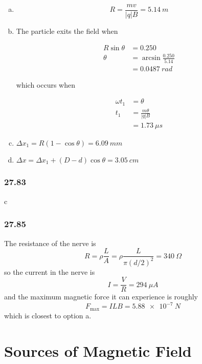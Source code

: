 \documentclass{article}
\begin{document}
\begin{enumerate}[(a)]
  \item \[R = \frac{m v}{|q| B} = \qty{5.14}{m}\]

  \item The particle exits the field when

        \begin{align*}
          R \sin \theta & = 0.250                      \\
          \theta        & = \arcsin \frac{0.250}{5.14} \\
                        & = \qty{0.0487}{rad}
        \end{align*}

        which occurs when

        \begin{align*}
          \omega t_1 & = \theta                 \\
          t_1        & = \frac{m \theta}{|q| B} \\
                     & = \qty{1.73}{\mu s}
        \end{align*}

  \item $\Delta x_1 = R (1 - \cos \theta) = \qty{6.09}{mm}$

  \item $\Delta x = \Delta x_1 + (D - d) \cos \theta = \qty{3.05}{cm}$
\end{enumerate}

\subsubsection{27.83}

c

\subsubsection{27.85}

The resistance of the nerve is \[R = \rho \frac{L}{A} = \rho \frac{L}{\pi (d / 2)^2} = \qty{340}{\Omega}\] so the current in the nerve is \[I = \frac{V}{R} = \qty{294}{\mu A}\] and the maximum magnetic force it can experience is roughly \[F_\textrm{max} = I L B = \qty{5.88e-7}{N}\] which is closest to option a.

\section{Sources of Magnetic Field}
\end{document}
